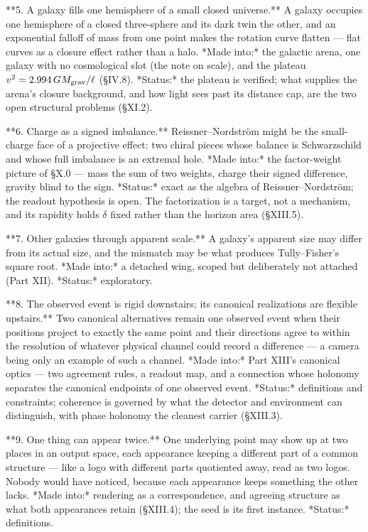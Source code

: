 **5. A galaxy fills one hemisphere of a small closed universe.** A galaxy occupies one hemisphere of a closed three-sphere and its dark twin the other, and an exponential falloff of mass from one point makes the rotation curve flatten — flat curves as a closure effect rather than a halo. *Made into:* the galactic arena, one galaxy with no cosmological slot (the note on scale), and the plateau $v^2 = 2.994\,GM_{\rm grav}/\ell$ (§IV.8). *Status:* the plateau is verified; what supplies the arena's closure background, and how light sees past its distance cap, are the two open structural problems (§XI.2).

**6. Charge as a signed imbalance.** Reissner–Nordström might be the small-charge face of a projective effect: two chiral pieces whose balance is Schwarzschild and whose full imbalance is an extremal hole. *Made into:* the factor-weight picture of §X.0 — mass the sum of two weights, charge their signed difference, gravity blind to the sign. *Status:* exact as the algebra of Reissner–Nordström; the readout hypothesis is open. The factorization is a target, not a mechanism, and its rapidity holds $\delta$ fixed rather than the horizon area (§XIII.5).

**7. Other galaxies through apparent scale.** A galaxy's apparent size may differ from its actual size, and the mismatch may be what produces Tully–Fisher's square root. *Made into:* a detached wing, scoped but deliberately not attached (Part XII). *Status:* exploratory.

**8. The observed event is rigid downstairs; its canonical realizations are flexible upstairs.** Two canonical alternatives remain one observed event when their positions project to exactly the same point and their directions agree to within the resolution of whatever physical channel could record a difference — a camera being only an example of such a channel. *Made into:* Part XIII's canonical optics — two agreement rules, a readout map, and a connection whose holonomy separates the canonical endpoints of one observed event. *Status:* definitions and constraints; coherence is governed by what the detector and environment can distinguish, with phase holonomy the cleanest carrier (§XIII.3).

**9. One thing can appear twice.** One underlying point may show up at two places in an output space, each appearance keeping a different part of a common structure — like a logo with different parts quotiented away, read as two logos. Nobody would have noticed, because each appearance keeps something the other lacks. *Made into:* rendering as a correspondence, and agreeing structure as what both appearances retain (§XIII.4); the seed is its first instance. *Status:* definitions.

